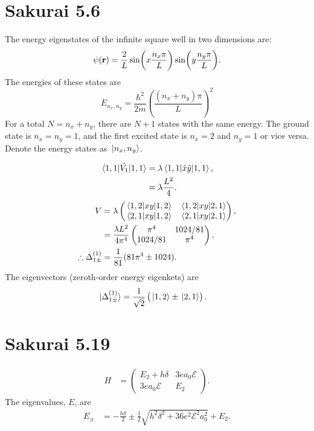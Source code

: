 \documentclass[
a4paper,
10pt,
twoside,
]{article}
\begin{document}
\section{Sakurai 5.6}\label{sec: II}
The energy eigenstates of the infinite square well in two dimensions are:
\begin{equation}
	\psi(\vb{r}) = \frac{2}{L}\sin(x\frac{n_x\pi}{L})\sin(y\frac{n_y\pi}{L}).
\end{equation}
The energies of these states are
\begin{equation}
	E_{n_x,n_y} = \frac{\hbar^2}{2m} \left(\frac{(n_x+n_y)\pi}{L}\right)^2
\end{equation}
For a total $N = n_x + n_y$, there are $N+1$ states with the same energy.
The ground state is $n_x = n_y = 1$, and the first excited state is $n_x = 2$ and $n_y = 1$ or vice versa.
Denote the energy states as $\ket*{n_x,n_y}$.

\begin{align}
	\mel*{1,1}{\hat{V_1}}{1,1} &= \lambda\mel*{1,1}{\hat{x}\hat{y}}{1,1},\\
	&= \lambda \frac{L^2}{4}.
\end{align}
\begin{align}
	V &= \lambda \begin{pmatrix}
		\mel*{1,2}{xy}{1,2} & \mel*{1,2}{xy}{2,1}\\
		\mel*{2,1}{xy}{1,2} & \mel*{2,1}{xy}{2,1}
	\end{pmatrix},\\
	&= \frac{\lambda L^2}{4\pi^4} \begin{pmatrix}
		\pi^4 & 1024/81\\
		1024/81 & \pi^4
	\end{pmatrix},\\
	\therefore \Delta_{1\pm}^{(1)} &= \frac{1}{81}(81\pi^4 \pm 1024).
\end{align}
The eigenvectors (zeroth-order energy eigenkets) are
\begin{align}
	\ket*{\Delta_{1\pm}^{(1)}} &= \frac{1}{\sqrt{2}} \left(\ket*{1,2}\pm\ket*{2,1}\right).
\end{align}

\section{Sakurai 5.19}\label{sec: III}

\begin{align}
	H &= \begin{pmatrix}
		E_2 + h\delta & 3ea_0\mathcal{E}\\
		3ea_0\mathcal{E} & E_2
	\end{pmatrix}.
\end{align}
The eigenvalues, $E$, are
\begin{align}
	E_\pm &= -\frac{h \delta}{2} \pm \frac{1}{2}\sqrt{h^2\delta^2 + 36e^2\mathcal{E}^2 a_0^2} + E_2.
\end{align}
\end{document}
